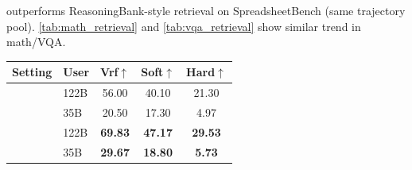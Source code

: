 \centering
\small
\setlength{\tabcolsep}{4pt}
\caption{\systemname{} outperforms ReasoningBank-style retrieval on SpreadsheetBench (same trajectory pool). \cref{tab:math_retrieval} and \cref{tab:vqa_retrieval} show similar trend in math/VQA.}
\label{tab:reasoning_bank}
\begin{tabular}{@{}l l ccc@{}}
\toprule
\textbf{Setting}
    & \textbf{User}
    & \textbf{Vrf}$\uparrow$
    & \textbf{Soft}$\uparrow$
    & \textbf{Hard}$\uparrow$ \\
\midrule
{}
    & 122B & 56.00 & 40.10 & 21.30 \\
    & 35B & 20.50 & 17.30 & 4.97 \\
\midrule
{}
    & 122B & \textbf{69.83} & \textbf{47.17} & \textbf{29.53} \\
    & 35B & \textbf{29.67} & \textbf{18.80} & \textbf{5.73} \\
\bottomrule
\end{tabular}
